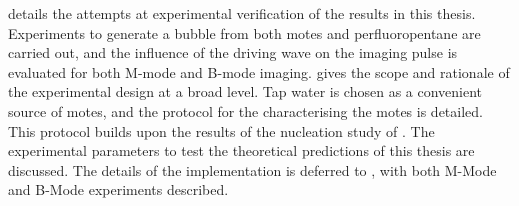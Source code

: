 


 details the attempts at experimental verification of the results in this thesis. 
Experiments to generate a bubble from both motes and perfluoropentane are carried out,
and the influence of the driving wave on the imaging pulse 
is evaluated for both M-mode and B-mode imaging.
 gives the scope and rationale of the experimental design at a broad level.
Tap water is chosen as a convenient source of motes,
and the protocol for the characterising the motes is detailed.
This protocol builds upon the results of the nucleation study of .
The experimental parameters to test the theoretical predictions
of this thesis are discussed.
The details of the implementation is deferred to ,
with both  M-Mode and B-Mode experiments described.

